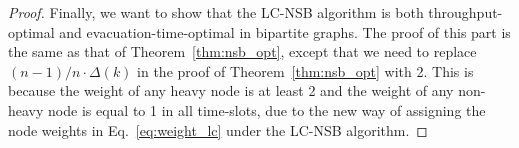 \documentclass[10pt,journal,compsoc]{IEEEtran}
\begin{document}
\begin{proof}
Finally, we want to show that the LC-NSB algorithm is both throughput-optimal 
and evacuation-time-optimal in bipartite graphs.
The proof of this part is the same as that of Theorem~\ref{thm:nsb_opt},
except that we need to replace $(n-1)/n \cdot \Delta(k)$ in the proof 
of Theorem~\ref{thm:nsb_opt} with 2. This is because the weight of any heavy 
node is at least 2 and the weight of any non-heavy node is equal to 1 in all time-slots,
due to the new way of assigning the node weights in Eq.~\eqref{eq:weight_lc} under the LC-NSB algorithm. 
\end{proof}
\end{document}

